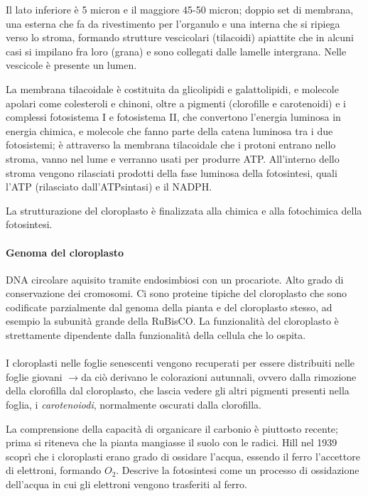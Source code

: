 \documentclass[a4paper,12pt]{book}
\newcommand{\lfreccia}{\ensuremath{\longrightarrow}}
\begin{document}
Il lato inferiore è 5 micron e il maggiore 45-50 micron; doppio set di membrana, una esterna che fa da rivestimento per l'organulo e una interna che si ripiega verso lo stroma, formando strutture vescicolari (tilacoidi) apiattite che in alcuni casi si impilano fra loro (grana) e sono collegati dalle lamelle intergrana. Nelle vescicole è presente un lumen.

La membrana tilacoidale è costituita da glicolipidi e galattolipidi, e molecole apolari come colesteroli e chinoni, oltre a pigmenti (clorofille e carotenoidi) e i complessi fotosistema I e fotosistema II, che convertono l'energia luminosa in energia chimica, e molecole che fanno parte della catena luminosa tra i due fotosistemi; è attraverso la membrana tilacoidale che i protoni entrano nello stroma, vanno nel lume e verranno usati per produrre ATP. All'interno dello stroma vengono rilasciati prodotti della fase luminosa della fotosintesi, quali l'ATP (rilasciato dall'ATPsintasi) e il NADPH.

La strutturazione del cloroplasto è finalizzata alla chimica e alla fotochimica della fotosintesi.

\paragraph{Genoma del cloroplasto}
DNA circolare aquisito tramite endosimbiosi con un procariote. Alto grado di conservazione dei cromosomi.
Ci sono proteine tipiche del cloroplasto che sono codificate parzialmente dal genoma della pianta e del cloroplasto stesso, ad esempio la subunità grande della RuBisCO. La funzionalità del cloroplasto è strettamente dipendente dalla funzionalità della cellula che lo ospita.
\paragraph{}
I cloroplasti nelle foglie senescenti vengono recuperati per essere distribuiti nelle foglie giovani \lfreccia da ciò derivano le colorazioni autunnali, ovvero dalla rimozione della clorofilla dal cloroplasto, che lascia vedere gli altri pigmenti presenti nella foglia, i \emph{carotenoiodi}, normalmente oscurati dalla clorofilla.

La comprensione della capacità di organicare il carbonio è piuttosto recente; prima si riteneva che la pianta mangiasse il suolo con le radici. 
Hill nel 1939 scoprì che i cloroplasti erano grado di ossidare l'acqua, essendo il ferro l'accettore di elettroni, formando $O_{2}$. Descrive la fotosintesi come un processo di ossidazione dell'acqua in cui gli elettroni vengono trasferiti al ferro.
\end{document}
